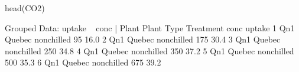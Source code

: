 \begin{Schunk}
% --begin: "pbld1"
\begin{Sinput}
 head(CO2)
\end{Sinput}
\begin{Soutput}
Grouped Data: uptake ~ conc | Plant
  Plant   Type  Treatment conc uptake
1   Qn1 Quebec nonchilled   95   16.0
2   Qn1 Quebec nonchilled  175   30.4
3   Qn1 Quebec nonchilled  250   34.8
4   Qn1 Quebec nonchilled  350   37.2
5   Qn1 Quebec nonchilled  500   35.3
6   Qn1 Quebec nonchilled  675   39.2
\end{Soutput}
%
% --end: "pbld1"
\end{Schunk}
